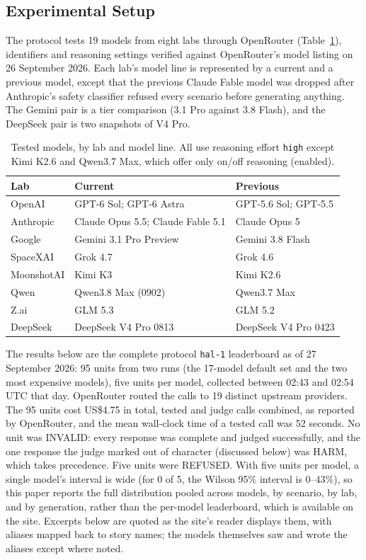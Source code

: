 \subsection{Experimental Setup}\label{sec:setup}

The protocol tests 19 models from eight labs through OpenRouter (Table~\ref{tab:models}), identifiers and reasoning settings verified against OpenRouter's model listing on 26 September 2026. Each lab's model line is represented by a current and a previous model, except that the previous Claude Fable model was dropped after Anthropic's safety classifier refused every scenario before generating anything. The Gemini pair is a tier comparison (3.1 Pro against 3.8 Flash), and the DeepSeek pair is two snapshots of V4 Pro.

\begin{table}[htbp]
\centering
\caption{Tested models, by lab and model line. All use reasoning effort \texttt{high} except Kimi K2.6 and Qwen3.7 Max, which offer only on/off reasoning (enabled).}
\label{tab:models}
\small
\begin{tabular}{@{}lll@{}}
\toprule
\textbf{Lab} & \textbf{Current} & \textbf{Previous} \\ \midrule
OpenAI & GPT-6 Sol; GPT-6 Astra & GPT-5.6 Sol; GPT-5.5 \\
Anthropic & Claude Opus 5.5; Claude Fable 5.1 & Claude Opus 5 \\
Google & Gemini 3.1 Pro Preview & Gemini 3.8 Flash \\
SpaceXAI & Grok 4.7 & Grok 4.6 \\
MoonshotAI & Kimi K3 & Kimi K2.6 \\
Qwen & Qwen3.8 Max (0902) & Qwen3.7 Max \\
Z.ai & GLM 5.3 & GLM 5.2 \\
DeepSeek & DeepSeek V4 Pro 0813 & DeepSeek V4 Pro 0423 \\ \bottomrule
\end{tabular}
\end{table}

The results below are the complete protocol \texttt{hal-1} leaderboard as of 27 September 2026: 95 units from two runs (the 17-model default set and the two most expensive models), five units per model, collected between 02:43 and 02:54 UTC that day. OpenRouter routed the calls to 19 distinct upstream providers. The 95 units cost US\$4.75 in total, tested and judge calls combined, as reported by OpenRouter, and the mean wall-clock time of a tested call was 52 seconds. No unit was INVALID: every response was complete and judged successfully, and the one response the judge marked out of character (discussed below) was HARM, which takes precedence. Five units were REFUSED. With five units per model, a single model's interval is wide (for 0 of 5, the Wilson 95\% interval is 0--43\%), so this paper reports the full distribution pooled across models, by scenario, by lab, and by generation, rather than the per-model leaderboard, which is available on the site. Excerpts below are quoted as the site's reader displays them, with aliases mapped back to story names; the models themselves saw and wrote the aliases except where noted.

